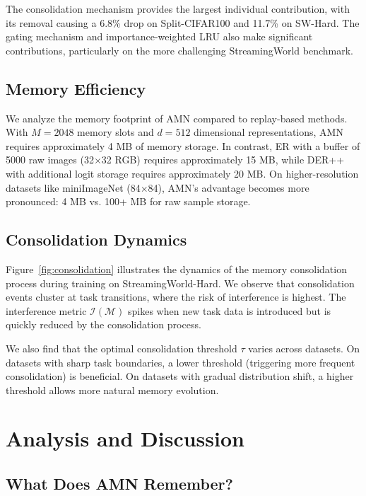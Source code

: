\documentclass[11pt]{article}
\begin{document}
The consolidation mechanism provides the largest individual contribution, with its removal causing a 6.8\% drop on Split-CIFAR100 and 11.7\% on SW-Hard. The gating mechanism and importance-weighted LRU also make significant contributions, particularly on the more challenging StreamingWorld benchmark.

\subsection{Memory Efficiency}

We analyze the memory footprint of AMN compared to replay-based methods. With $M = 2048$ memory slots and $d = 512$ dimensional representations, AMN requires approximately 4 MB of memory storage. In contrast, ER with a buffer of 5000 raw images (32$\times$32 RGB) requires approximately 15 MB, while DER++ with additional logit storage requires approximately 20 MB. On higher-resolution datasets like miniImageNet (84$\times$84), AMN's advantage becomes more pronounced: 4 MB vs. 100+ MB for raw sample storage.

\subsection{Consolidation Dynamics}

Figure~\ref{fig:consolidation} illustrates the dynamics of the memory consolidation process during training on StreamingWorld-Hard. We observe that consolidation events cluster at task transitions, where the risk of interference is highest. The interference metric $\mathcal{I}(\mathcal{M})$ spikes when new task data is introduced but is quickly reduced by the consolidation process.

We also find that the optimal consolidation threshold $\tau$ varies across datasets. On datasets with sharp task boundaries, a lower threshold (triggering more frequent consolidation) is beneficial. On datasets with gradual distribution shift, a higher threshold allows more natural memory evolution.

\section{Analysis and Discussion}
\label{sec:analysis}

\subsection{What Does AMN Remember?}
\end{document}
